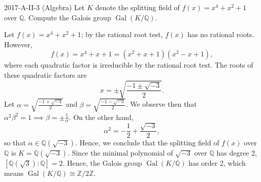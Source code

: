 \documentclass{article}
\begin{document}
\begin{prb}{2017-A-II-3 (Algebra)}
	Let $K$ denote the splitting field of $f(x) = x^{4} + x^{2} + 1$ over $\mathbb{Q}$. Compute the Galois group $\operatorname{Gal}(K/\mathbb{Q})$. 
\end{prb}
\begin{solutions}
	Let $f(x) = x^{4} + x^{2} + 1$; by the rational root test, $f(x)$ has no rational roots. However,
		\begin{equation}
			f(x) = x^{4} + x + 1 = (x^{2} + x + 1)(x^{2} - x+ 1), 
		\end{equation}
	where each quadratic factor is irreducible by the rational root test. The roots of these quadratic factors are 
		\begin{equation}
			x = \pm\sqrt{\frac{-1 \pm \sqrt{-3}}{2}}. 
		\end{equation}
	Let $\alpha = \sqrt{\frac{-1 + \sqrt{-3}}{2}}$ and $\beta = \sqrt{\frac{-1 -\sqrt{-3}}{2}}$. We observe then that $\alpha^{2}\beta^{2} = 1 \implies \beta = \pm \frac{1}{\alpha}$. On the other hand, 
		\begin{equation}
			\alpha^{2} = -\frac{1}{2} + \frac{\sqrt{-3}}{2},
		\end{equation}
	so that $\alpha \in \mathbb{Q}(\sqrt{-3})$. Hence, we conclude that the splitting field of $f(x)$ over $\mathbb{Q}$ is $K = \mathbb{Q}(\sqrt{-3})$. Since the minimal polynomial of $\sqrt{-3}$ over $\mathbb{Q}$ has degree 2, $[\mathbb{Q}(\sqrt{3}): \mathbb{Q}] = 2$. Hence, the Galois group $\operatorname{Gal}(K/\mathbb{Q})$ has order 2, which means $\operatorname{Gal}(K/\mathbb{Q}) \cong \mathbb{Z}/2\mathbb{Z}$. 
\end{solutions}
\end{document}
